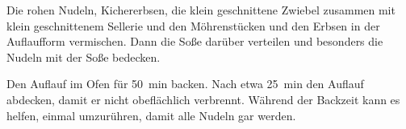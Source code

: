 \begin{recipe}
{        \step Die rohen Nudeln, Kichererbsen, die klein geschnittene Zwiebel zusammen mit klein geschnittenem Sellerie und den Möhrenstücken und den Erbsen in der Auflaufform vermischen. Dann die Soße darüber verteilen und besonders die Nudeln mit der Soße bedecken.

        \step Den Auflauf im Ofen für \SI{50}{\minute} backen. Nach etwa \SI{25}{\minute} den Auflauf abdecken, damit er nicht obeflächlich verbrennt. Während der Backzeit kann es helfen, einmal umzurühren, damit alle Nudeln gar werden.
    }



\end{recipe}

